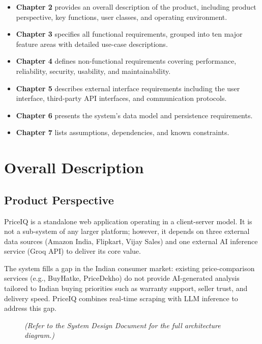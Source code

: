 \documentclass[12pt,a4paper]{report}
\begin{document}
\begin{itemize}[noitemsep]
  \item \textbf{Chapter 2} provides an overall description of the product,
        including product perspective, key functions, user classes, and
        operating environment.
  \item \textbf{Chapter 3} specifies all functional requirements, grouped
        into ten major feature areas with detailed use-case descriptions.
  \item \textbf{Chapter 4} defines non-functional requirements covering
        performance, reliability, security, usability, and maintainability.
  \item \textbf{Chapter 5} describes external interface requirements including
        the user interface, third-party API interfaces, and communication
        protocols.
  \item \textbf{Chapter 6} presents the system's data model and persistence
        requirements.
  \item \textbf{Chapter 7} lists assumptions, dependencies, and known
        constraints.
\end{itemize}

\chapter{Overall Description}

\section{Product Perspective}
PriceIQ is a standalone web application operating in a client-server model. It
is not a sub-system of any larger platform; however, it depends on three external
data sources (Amazon India, Flipkart, Vijay Sales) and one external AI inference
service (Groq API) to deliver its core value.

The system fills a gap in the Indian consumer market: existing price-comparison
services (e.g., BuyHatke, PriceDekho) do not provide AI-generated analysis
tailored to Indian buying priorities such as warranty support, seller trust,
and delivery speed. PriceIQ combines real-time scraping with LLM inference to
address this gap.

\begin{figure}[h]
\centering
\textit{(Refer to the System Design Document for the full architecture diagram.)}
\end{figure}
\end{document}
